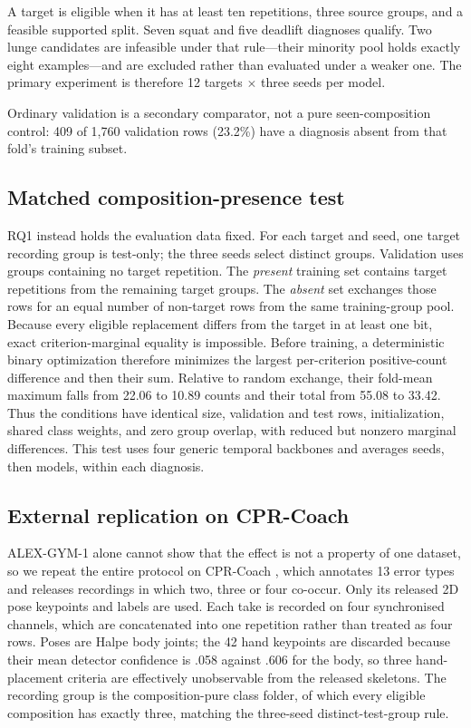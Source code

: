 \documentclass[conference,a4paper]{IEEEtran}
\begin{document}
A target is eligible when it has at least ten repetitions, three source groups,
and a feasible supported split. Seven squat and five deadlift diagnoses qualify.
Two lunge candidates are infeasible under that rule---their minority pool
holds exactly eight examples---and are excluded rather than evaluated under a
weaker one. The primary experiment is therefore 12 targets $\times$ three
seeds per model.

Ordinary validation is a secondary comparator, not a pure seen-composition
control: 409 of 1,760 validation rows (23.2\%) have a diagnosis absent from
that fold's training subset.

\subsection{Matched composition-presence test}
RQ1 instead holds the evaluation data fixed. For each target and seed, one target
recording group is test-only; the three seeds select distinct groups. Validation
uses groups containing no target repetition. The \emph{present} training set
contains target repetitions from the remaining target groups. The \emph{absent}
set exchanges those rows for an equal number of non-target rows from the same
training-group pool. Because every eligible replacement differs from the target
in at least one bit, exact criterion-marginal equality is impossible. Before
training, a deterministic binary optimization therefore minimizes the largest
per-criterion positive-count difference and then their sum. Relative to random
exchange, their fold-mean maximum falls from 22.06 to 10.89 counts and their
total from 55.08 to 33.42. Thus the conditions have identical size, validation
and test rows, initialization, shared class weights, and zero group overlap,
with reduced but nonzero marginal differences. This test uses four generic temporal
backbones and averages seeds, then models, within each diagnosis.

\subsection{External replication on CPR-Coach}
ALEX-GYM-1 alone cannot show that the effect is not a property of one dataset,
so we repeat the entire protocol on CPR-Coach \cite{wang2024cpr}, which
annotates 13 error types and releases recordings in which two, three or four
co-occur. Only its released 2D pose keypoints and labels are used. Each take is
recorded on four synchronised channels, which are concatenated into one
repetition rather than treated as four rows. Poses are Halpe body joints; the 42
hand keypoints are discarded because their mean detector confidence is .058
against .606 for the body, so three hand-placement criteria are effectively
unobservable from the released skeletons. The recording group is the
composition-pure class folder, of which every eligible composition has exactly
three, matching the three-seed distinct-test-group rule.
\end{document}
